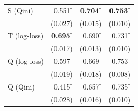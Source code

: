\begin{tabular}{l|rrr}
S (Qini) & 0.551$^\dagger$ & \textbf{0.704}$^\dagger$ & \textbf{0.753}$^\dagger$ \\
 & \scriptsize (0.027) & \scriptsize (0.015) & \scriptsize (0.010) \\[2pt]
T (log-loss) & \textbf{0.695}$^\dagger$ & 0.690$^\dagger$ & 0.731$^\dagger$ \\
 & \scriptsize (0.017) & \scriptsize (0.013) & \scriptsize (0.010) \\[2pt]
Q (log-loss) & 0.597$^\dagger$ & 0.669$^\dagger$ & 0.753$^\dagger$ \\
 & \scriptsize (0.019) & \scriptsize (0.018) & \scriptsize (0.008) \\[2pt]
Q (Qini) & 0.415$^\dagger$ & 0.657$^\dagger$ & 0.735$^\dagger$ \\
 & \scriptsize (0.028) & \scriptsize (0.016) & \scriptsize (0.010) \\[2pt]
\hline
\end{tabular}

